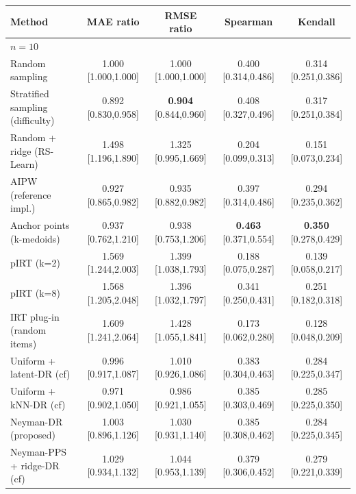 \begin{tabular}{l cccc}
\toprule
Method & MAE ratio & RMSE ratio & Spearman & Kendall\\
\midrule
\multicolumn{5}{l}{\emph{$n=10$}}\\
Random sampling & 1.000 {\scriptsize[1.000,1.000]} & 1.000 {\scriptsize[1.000,1.000]} & 0.400 {\scriptsize[0.314,0.486]} & 0.314 {\scriptsize[0.251,0.386]} \\
Stratified sampling (difficulty) & 0.892 {\scriptsize[0.830,0.958]} & \textbf{0.904} {\scriptsize[0.844,0.960]} & 0.408 {\scriptsize[0.327,0.496]} & 0.317 {\scriptsize[0.251,0.384]} \\
Random + ridge (RS-Learn) & 1.498 {\scriptsize[1.196,1.890]} & 1.325 {\scriptsize[0.995,1.669]} & 0.204 {\scriptsize[0.099,0.313]} & 0.151 {\scriptsize[0.073,0.234]} \\
AIPW (reference impl.) & 0.927 {\scriptsize[0.865,0.982]} & 0.935 {\scriptsize[0.882,0.982]} & 0.397 {\scriptsize[0.314,0.486]} & 0.294 {\scriptsize[0.235,0.362]} \\
Anchor points (k-medoids) & 0.937 {\scriptsize[0.762,1.210]} & 0.938 {\scriptsize[0.753,1.206]} & \textbf{0.463} {\scriptsize[0.371,0.554]} & \textbf{0.350} {\scriptsize[0.278,0.429]} \\
pIRT (k=2) & 1.569 {\scriptsize[1.244,2.003]} & 1.399 {\scriptsize[1.038,1.793]} & 0.188 {\scriptsize[0.075,0.287]} & 0.139 {\scriptsize[0.058,0.217]} \\
pIRT (k=8) & 1.568 {\scriptsize[1.205,2.048]} & 1.396 {\scriptsize[1.032,1.797]} & 0.341 {\scriptsize[0.250,0.431]} & 0.251 {\scriptsize[0.182,0.318]} \\
IRT plug-in (random items) & 1.609 {\scriptsize[1.241,2.064]} & 1.428 {\scriptsize[1.055,1.841]} & 0.173 {\scriptsize[0.062,0.280]} & 0.128 {\scriptsize[0.048,0.209]} \\
Uniform + latent-DR (cf) & 0.996 {\scriptsize[0.917,1.087]} & 1.010 {\scriptsize[0.926,1.086]} & 0.383 {\scriptsize[0.304,0.463]} & 0.284 {\scriptsize[0.225,0.347]} \\
Uniform + kNN-DR (cf) & 0.971 {\scriptsize[0.902,1.050]} & 0.986 {\scriptsize[0.921,1.055]} & 0.385 {\scriptsize[0.303,0.469]} & 0.285 {\scriptsize[0.225,0.350]} \\
Neyman-DR (proposed) & 1.003 {\scriptsize[0.896,1.126]} & 1.030 {\scriptsize[0.931,1.140]} & 0.385 {\scriptsize[0.308,0.462]} & 0.284 {\scriptsize[0.225,0.345]} \\
Neyman-PPS + ridge-DR (cf) & 1.029 {\scriptsize[0.934,1.132]} & 1.044 {\scriptsize[0.953,1.139]} & 0.379 {\scriptsize[0.306,0.452]} & 0.279 {\scriptsize[0.221,0.339]} \\

\end{tabular}
